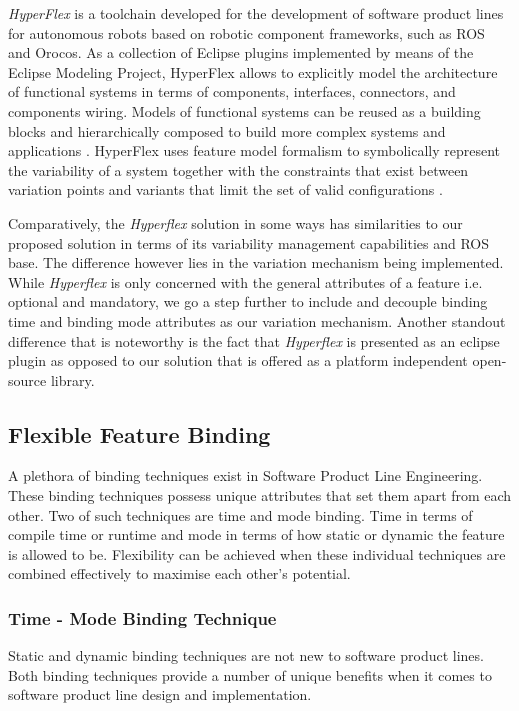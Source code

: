 \documentclass[conference]{IEEEtran}
\begin{document}
\textit{HyperFlex} is a toolchain developed for the development of software product lines for autonomous robots based on robotic component frameworks, such as ROS and Orocos.
As a collection of Eclipse plugins implemented by means of the Eclipse Modeling Project, HyperFlex allows to explicitly model the architecture of functional systems in terms of components, interfaces, connectors, and components wiring. Models of functional systems can be reused as a building blocks and hierarchically composed to build more complex systems and applications \cite{ros-ref}. HyperFlex uses feature model formalism to symbolically represent the variability of a system together with the constraints that exist between variation points and variants that limit the set of valid configurations \cite{ros-ref}.

Comparatively, the \textit{Hyperflex} solution in some ways has similarities to our proposed solution in terms of its variability management capabilities and ROS base. The difference however lies in the variation mechanism being implemented. While \textit{Hyperflex} is only concerned with the general attributes of a feature i.e. optional and mandatory, we go a step further to include and decouple binding time and binding mode attributes as our variation mechanism. Another standout difference that is noteworthy is the fact that \textit{Hyperflex} is presented as an eclipse plugin as opposed to our solution that is offered as a platform independent open-source library.

\subsection{Flexible Feature Binding}
A plethora of binding techniques exist in Software Product Line Engineering. These binding techniques possess unique attributes that set them apart from each other. Two of such techniques are time and mode binding. Time in terms of compile time or runtime and mode in terms of how static or dynamic the feature is allowed to be. Flexibility can be achieved when these individual techniques are combined effectively to maximise each other's potential.

\subsubsection{Time - Mode Binding Technique}
Static and dynamic binding techniques are not new to software product lines. Both binding techniques provide a number of unique benefits when it comes to software product line design and implementation. 
\end{document}
